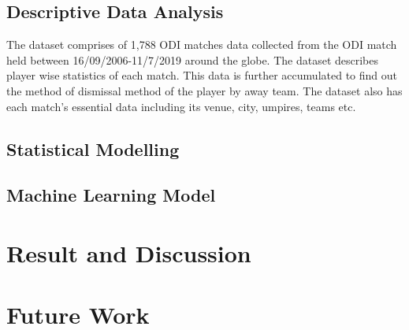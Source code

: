 \documentclass[fleqn,10pt]{wlscirep}
\begin{document}
\subsection{Descriptive Data Analysis}
The dataset comprises of 1,788 ODI matches data collected from the ODI match held between 16/09/2006-11/7/2019 around the globe. 
The dataset describes player wise statistics of each match. This data is further accumulated to find out the 
method of dismissal method of the player by away team. 
The dataset also has each match's essential data including its venue, city, umpires, teams etc.
\subsection{Statistical Modelling}
\subsection{Machine Learning Model}
\section{Result and Discussion}
\section{Future Work}
\appendix
\end{document}
